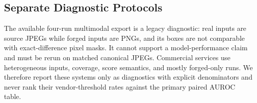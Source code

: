 \subsection{Separate Diagnostic Protocols}

The available four-run multimodal export is a legacy diagnostic: real inputs are source JPEGs while forged inputs are PNGs, and its boxes are not comparable with exact-difference pixel masks. It cannot support a model-performance claim and must be rerun on matched canonical JPEGs. Commercial services use heterogeneous inputs, coverage, score semantics, and mostly forged-only runs. We therefore report these systems only as diagnostics with explicit denominators and never rank their vendor-threshold rates against the primary paired AUROC table.
